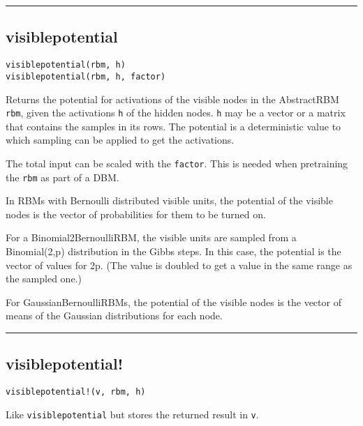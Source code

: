 \noindent\rule{\textwidth}{1pt}
\subsection*{visiblepotential}  \label{bms_visiblepotential}
\begin{verbatim}
visiblepotential(rbm, h)
visiblepotential(rbm, h, factor)
\end{verbatim}
Returns the potential for activations of the visible nodes in the AbstractRBM \texttt{rbm}, given the activations \texttt{h} of the hidden nodes. \texttt{h} may be a vector or a matrix that contains the samples in its rows. The potential is a deterministic value to which sampling can be applied to get the activations.

The total input can be scaled with the \texttt{factor}. This is needed when pretraining the \texttt{rbm} as part of a DBM.

In RBMs with Bernoulli distributed visible units, the potential of the visible nodes is the vector of probabilities for them to be turned on.

For a Binomial2BernoulliRBM, the visible units are sampled from a Binomial(2,p) distribution in the Gibbs steps. In this case, the potential is the vector of values for 2p. (The value is doubled to get a value in the same range as the sampled one.)

For GaussianBernoulliRBMs, the potential of the visible nodes is the vector of means of the Gaussian distributions for each node.

\noindent\rule{\textwidth}{1pt}
\subsection*{visiblepotential!}  \label{bms_visiblepotential!}
\begin{verbatim}
visiblepotential!(v, rbm, h)
\end{verbatim}
Like \texttt{visiblepotential} but stores the returned result in \texttt{v}.

